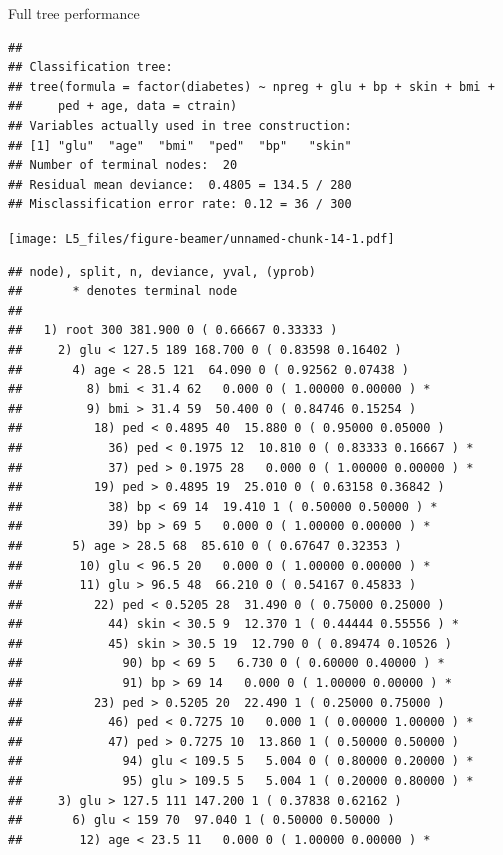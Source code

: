 \documentclass[
  ignorenonframetext,
]{beamer}
\begin{document}
\begin{frame}[fragile]

\begin{block}{Full tree performance}

\begin{verbatim}
## 
## Classification tree:
## tree(formula = factor(diabetes) ~ npreg + glu + bp + skin + bmi + 
##     ped + age, data = ctrain)
## Variables actually used in tree construction:
## [1] "glu"  "age"  "bmi"  "ped"  "bp"   "skin"
## Number of terminal nodes:  20 
## Residual mean deviance:  0.4805 = 134.5 / 280 
## Misclassification error rate: 0.12 = 36 / 300
\end{verbatim}

\texttt{[image: L5\_files/figure-beamer/unnamed-chunk-14-1.pdf]}

\begin{verbatim}
## node), split, n, deviance, yval, (yprob)
##       * denotes terminal node
## 
##   1) root 300 381.900 0 ( 0.66667 0.33333 )  
##     2) glu < 127.5 189 168.700 0 ( 0.83598 0.16402 )  
##       4) age < 28.5 121  64.090 0 ( 0.92562 0.07438 )  
##         8) bmi < 31.4 62   0.000 0 ( 1.00000 0.00000 ) *
##         9) bmi > 31.4 59  50.400 0 ( 0.84746 0.15254 )  
##          18) ped < 0.4895 40  15.880 0 ( 0.95000 0.05000 )  
##            36) ped < 0.1975 12  10.810 0 ( 0.83333 0.16667 ) *
##            37) ped > 0.1975 28   0.000 0 ( 1.00000 0.00000 ) *
##          19) ped > 0.4895 19  25.010 0 ( 0.63158 0.36842 )  
##            38) bp < 69 14  19.410 1 ( 0.50000 0.50000 ) *
##            39) bp > 69 5   0.000 0 ( 1.00000 0.00000 ) *
##       5) age > 28.5 68  85.610 0 ( 0.67647 0.32353 )  
##        10) glu < 96.5 20   0.000 0 ( 1.00000 0.00000 ) *
##        11) glu > 96.5 48  66.210 0 ( 0.54167 0.45833 )  
##          22) ped < 0.5205 28  31.490 0 ( 0.75000 0.25000 )  
##            44) skin < 30.5 9  12.370 1 ( 0.44444 0.55556 ) *
##            45) skin > 30.5 19  12.790 0 ( 0.89474 0.10526 )  
##              90) bp < 69 5   6.730 0 ( 0.60000 0.40000 ) *
##              91) bp > 69 14   0.000 0 ( 1.00000 0.00000 ) *
##          23) ped > 0.5205 20  22.490 1 ( 0.25000 0.75000 )  
##            46) ped < 0.7275 10   0.000 1 ( 0.00000 1.00000 ) *
##            47) ped > 0.7275 10  13.860 1 ( 0.50000 0.50000 )  
##              94) glu < 109.5 5   5.004 0 ( 0.80000 0.20000 ) *
##              95) glu > 109.5 5   5.004 1 ( 0.20000 0.80000 ) *
##     3) glu > 127.5 111 147.200 1 ( 0.37838 0.62162 )  
##       6) glu < 159 70  97.040 1 ( 0.50000 0.50000 )  
##        12) age < 23.5 11   0.000 0 ( 1.00000 0.00000 ) *

\end{verbatim}
\end{block}
\end{frame}
\end{document}
